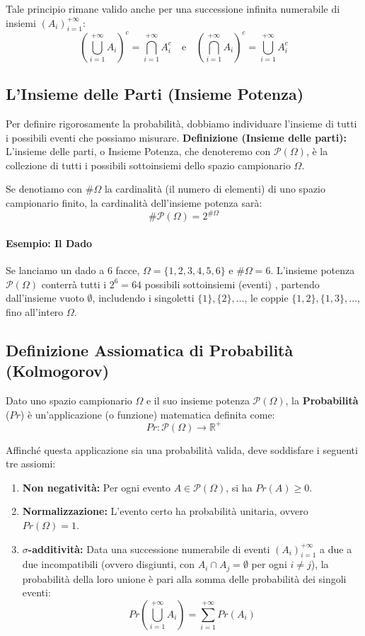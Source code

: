 \documentclass[12pt, a4paper]{article}
\begin{document}
Tale principio rimane valido anche per una successione infinita numerabile di insiemi $(A_i)_{i=1}^{+\infty}$:
$$ \left(\bigcup_{i=1}^{+\infty} A_i\right)^c = \bigcap_{i=1}^{+\infty} A_i^c \quad \text{e} \quad \left(\bigcap_{i=1}^{+\infty} A_i\right)^c = \bigcup_{i=1}^{+\infty} A_i^c $$ 

\subsection{L'Insieme delle Parti (Insieme Potenza)}
Per definire rigorosamente la probabilità, dobbiamo individuare l'insieme di tutti i possibili eventi che possiamo misurare.
\textbf{Definizione (Insieme delle parti):} L'insieme delle parti, o Insieme Potenza, che denoteremo con $\mathcal{P}(\Omega)$, è la collezione di tutti i possibili sottoinsiemi dello spazio campionario $\Omega$.

Se denotiamo con $\#\Omega$ la cardinalità (il numero di elementi) di uno spazio campionario finito, la cardinalità dell'insieme potenza sarà:
$$ \#\mathcal{P}(\Omega) = 2^{\#\Omega} $$ 

\paragraph{Esempio: Il Dado}
Se lanciamo un dado a 6 facce, $\Omega = \{1, 2, 3, 4, 5, 6\}$ e $\#\Omega = 6$.
L'insieme potenza $\mathcal{P}(\Omega)$ conterrà tutti i $2^6 = 64$ possibili sottoinsiemi (eventi) , partendo dall'insieme vuoto $\emptyset$, includendo i singoletti $\{1\}, \{2\}, \dots$, le coppie $\{1,2\}, \{1,3\}, \dots$, fino all'intero $\Omega$.

\subsection{Definizione Assiomatica di Probabilità (Kolmogorov)}
Dato uno spazio campionario $\Omega$ e il suo insieme potenza $\mathcal{P}(\Omega)$, la \textbf{Probabilità} ($Pr$) è un'applicazione (o funzione) matematica definita come:
$$ Pr: \mathcal{P}(\Omega) \rightarrow \mathbb{R}^+ $$ 

Affinché questa applicazione sia una probabilità valida, deve soddisfare i seguenti tre assiomi:
\begin{enumerate}
    \item \textbf{Non negatività:} Per ogni evento $A \in \mathcal{P}(\Omega)$, si ha $Pr(A) \ge 0$.
    \item \textbf{Normalizzazione:} L'evento certo ha probabilità unitaria, ovvero $Pr(\Omega) = 1$.
    \item \textbf{$\sigma$-additività:} Data una successione numerabile di eventi $(A_i)_{i=1}^{+\infty}$ a due a due incompatibili (ovvero disgiunti, con $A_i \cap A_j = \emptyset$ per ogni $i \ne j$), la probabilità della loro unione è pari alla somma delle probabilità dei singoli eventi:
    $$ Pr\left(\bigcup_{i=1}^{+\infty} A_i\right) = \sum_{i=1}^{+\infty} Pr(A_i) $$ 
\end{enumerate}
\end{document}
